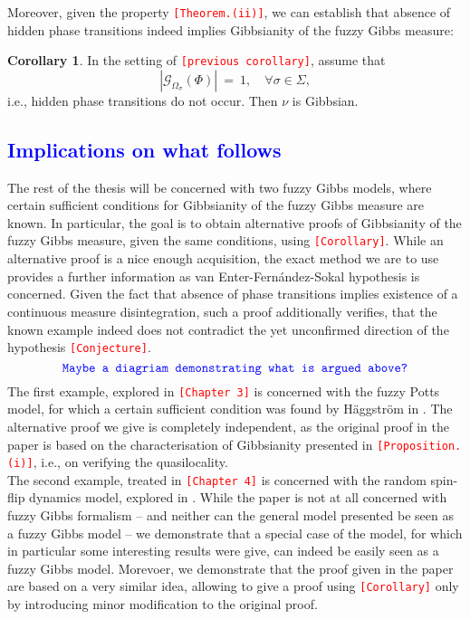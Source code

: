 \documentclass[12pt]{article}
\newcommand{\G}{\mathcal{G}}
\newcommand{\1}{\mathbbm{1}}
\newcommand{\5}{\vspace{0.5cm}}
\theoremstyle{definition}
\newtheorem{cor}[thm]{Corollary}
\begin{document}
Moreover, given the property \textcolor{red}{\texttt{[Theorem.(ii)]}}, we can establish that absence of hidden phase transitions indeed implies Gibbsianity of the fuzzy Gibbs measure:
\begin{cor}\label{Berghout}
In the setting of \textcolor{red}{\texttt{[previous corollary]}}, assume that 
$$|\G_{\Omega_\sigma}(\Phi)| ~=~ 1, \quad \forall \sigma\in\Sigma,$$
i.e., hidden phase transitions do not occur. Then $\nu$ is Gibbsian.
\end{cor}


\subsection{\textcolor{blue}{Implications on what follows}}

The rest of the thesis will be concerned with two fuzzy Gibbs models, where certain sufficient conditions for Gibbsianity of the fuzzy Gibbs measure are known. In particular, the goal is to obtain alternative proofs of Gibbsianity of the fuzzy Gibbs measure, given the same conditions, using \textcolor{red}{\texttt{[Corollary]}}. While an alternative proof is a nice enough acquisition, the exact method we are to use provides a further information as van Enter-Fern\'andez-Sokal hypothesis is concerned. Given the fact that absence of phase transitions implies existence of a continuous measure disintegration, such a proof additionally verifies, that the known example indeed does not contradict the yet unconfirmed direction of the hypothesis \textcolor{red}{\texttt{[Conjecture]}}.
$$\textcolor{blue}{\texttt{Maybe a diagriam demonstrating what is argued above?}}$$
The first example, explored in \textcolor{red}{\texttt{[Chapter 3]}} is concerned with the fuzzy Potts model, for which a certain sufficient condition was found by H\"aggstr\"om in \cite{Hag}. The alternative proof we give is completely independent, as the original proof in the paper is based on the characterisation of Gibbsianity presented in \textcolor{red}{\texttt{[Proposition.(i)]}}, i.e., on verifying the quasilocality. \\

The second example, treated in \textcolor{red}{\texttt{[Chapter 4]}} is concerned with the random spin-flip dynamics model, explored in \cite{EFHR}. While the paper is not at all concerned with fuzzy Gibbs formalism -- and neither can the general model presented be seen as a fuzzy Gibbs model -- we demonstrate that a special case of the model, for which in particular some interesting results were give, can indeed be easily seen as a fuzzy Gibbs model. Morevoer, we demonstrate that the proof given in the paper are based on a very similar idea, allowing to give a proof using \textcolor{red}{\texttt{[Corollary]}} only by introducing minor modification to the original proof.
\end{document}
